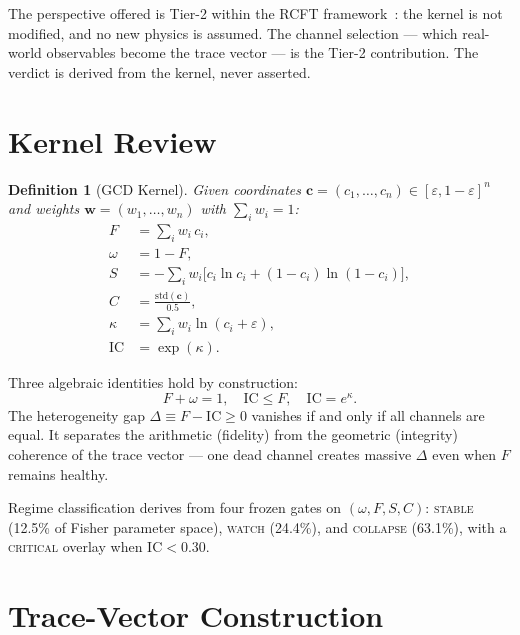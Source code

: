 \documentclass[
  aps,
  prd,
  twocolumn,
  superscriptaddress,
  nofootinbib,
  floatfix
]{revtex4-2}
\newtheorem{definition}[theorem]{Definition}
\newcommand{\eps}{\varepsilon}
\newcommand{\beq}{\begin{equation}}
\newcommand{\eeq}{\end{equation}}
\newcommand{\regime}[1]{\textrm{\upshape\scshape#1}}
\newcommand{\tvec}{\mathbf{c}}
\newcommand{\wvec}{\mathbf{w}}
\newcommand{\IC}{\mathrm{IC}}
\newcommand{\hetgap}{\Delta}
\newcommand{\Fid}{F}
\newcommand{\Drft}{\omega}
\newcommand{\Ent}{S}
\newcommand{\Curv}{C}
\newcommand{\Logint}{\kappa}
\begin{document}
The perspective offered is Tier-2 within the RCFT
framework~\cite{paulus2025rcft,paulus2025ucd}: the kernel is
not modified, and no new physics is assumed.
The channel selection --- which real-world observables become
the trace vector --- is the Tier-2 contribution.
The verdict is derived from the kernel, never asserted.

\section{Kernel Review}\label{sec:kernel}

\begin{definition}[GCD Kernel]\label{def:kernel}
Given coordinates $\tvec = (c_1, \ldots, c_n) \in [\eps, 1{-}\eps]^n$
and weights $\wvec = (w_1, \ldots, w_n)$ with $\sum_i w_i = 1$:
\begin{align}
  \Fid &= \sum_i w_i \, c_i, \label{eq:F} \\
  \Drft &= 1 - \Fid, \label{eq:omega} \\
  \Ent &= -\sum_i w_i \bigl[c_i \ln c_i
         + (1{-}c_i)\ln(1{-}c_i)\bigr], \label{eq:S} \\
  \Curv &= \frac{\mathrm{std}(\tvec)}{0.5}, \label{eq:C} \\
  \Logint &= \sum_i w_i \ln(c_i + \eps), \label{eq:kappa} \\
  \IC &= \exp(\Logint). \label{eq:IC}
\end{align}
\end{definition}

Three algebraic identities hold by construction:
\beq\label{eq:tier1}
  \Fid + \Drft = 1, \quad
  \IC \leq \Fid, \quad
  \IC = e^{\Logint}.
\eeq
The heterogeneity gap $\hetgap \equiv \Fid - \IC \geq 0$ vanishes
if and only if all channels are equal. It separates the arithmetic
(fidelity) from the geometric (integrity) coherence of the trace
vector --- one dead channel creates massive $\hetgap$ even when
$\Fid$ remains healthy.

Regime classification derives from four frozen gates on
$(\Drft, \Fid, \Ent, \Curv)$: \regime{stable} (12.5\% of
Fisher parameter space), \regime{watch} (24.4\%), and
\regime{collapse} (63.1\%), with a \regime{critical} overlay
when $\IC < 0.30$.

\section{Trace-Vector Construction}\label{sec:trace}
\end{document}
